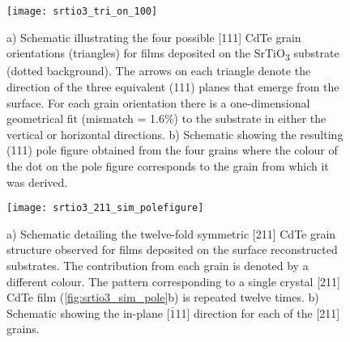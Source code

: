\begin{figure}
 \centering \texttt{[image: srtio3\_tri\_on\_100]}
 \caption[CdTe grains on (100) SrTiO\textsubscript{3}]{\label{fig:srtio3_tri_on_100}a) Schematic illustrating the four possible [111] CdTe grain orientations (triangles) for films deposited on the SrTiO\textsubscript{3}
  substrate (dotted background).
  The arrows on each triangle denote the direction of the three equivalent (111) planes that emerge from the surface.
  For each grain orientation there is a one-dimensional geometrical fit (mismatch = 1.6\%) to the substrate in either the vertical or horizontal directions.
  b) Schematic showing the
  resulting (111) pole figure obtained from the four grains where the colour of the dot on the pole figure corresponds to the grain from which it was derived.}
\end{figure}
\begin{figure}
 \centering \texttt{[image: srtio3\_211\_sim\_polefigure]}
 \caption[Simulated pole figure of CdTe on reconstructed SrTiO\textsubscript{3}]{\label{fig:srtio3_211_sim_polefigure}a) Schematic detailing the twelve-fold symmetric [211] CdTe grain structure observed for films deposited on the surface reconstructed substrates.
  The contribution from each grain is denoted by a different colour.
  The pattern corresponding to a single crystal [211] CdTe film (\cref{fig:srtio3_sim_pole}b) is repeated twelve times.
  b) Schematic showing the in-plane [\(\overline{1}\)11] direction for each of the [211] grains.}
\end{figure}

